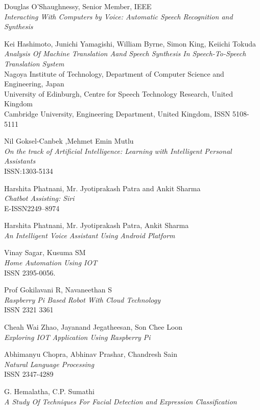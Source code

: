 \documentclass[12pt]{extreport}
\begin{document}
\renewcommand{\bibname}{REFERENCES}
\begin{thebibliography}{11}
 Douglas O’Shaughnessy, Senior Member, IEEE\\
\textit{Interacting With Computers by Voice: Automatic Speech Recognition and Synthesis}

 
\bibitem {} Kei Hashimoto, Junichi Yamagishi, William Byrne, Simon King, Keiichi Tokuda
\textit{Analysis Of Machine Translation Aand Speech Synthesis In Speech-To-Speech Translation System}\\
Nagoya Institute of Technology, Department of Computer Science and Engineering, Japan\\ University of Edinburgh, Centre for Speech Technology Research, United Kingdom\\
Cambridge University, Engineering Department, United Kingdom, ISSN 5108-5111

\bibitem {} Nil Goksel-Canbek ,Mehmet Emin Mutlu\\
\textit{On the track of Artificial Intelligence: Learning with  Intelligent Personal Assistants}\\ 
ISSN:1303-5134

\bibitem{} Harshita Phatnani, Mr. Jyotiprakash Patra and Ankit Sharma\\
 \textit{Chatbot Assisting: Siri}\\ 
 E-ISSN2249–8974 

\bibitem {} Harshita Phatnani, Mr. Jyotiprakash Patra, Ankit Sharma\\
\textit{An Intelligent Voice Assistant Using Android Platform}

\bibitem {} Vinay Sagar, Kusuma SM\\
\textit{Home Automation Using IOT}\\ 
 ISSN 2395-0056.

\bibitem{} Prof Gokilavani R, Navaneethan S\\
\textit{Raspberry Pi Based Robot With Cloud Technology}\\ 
 ISSN 2321 3361

\bibitem{} Cheah Wai Zhao, Jayanand Jegatheesan, Son Chee Loon\\
\textit{Exploring IOT Application Using Raspberry Pi}

\bibitem{} Abhimanyu Chopra, Abhinav Prashar, Chandresh Sain \\
\textit{Natural Language Processing}\\
ISSN 2347-4289

\bibitem{} G. Hemalatha, C.P. Sumathi\\
\textit{A Study Of Techniques For Facial Detection and Expression Classification}
\end{thebibliography}

\newpage
\appendix


\end{document}
